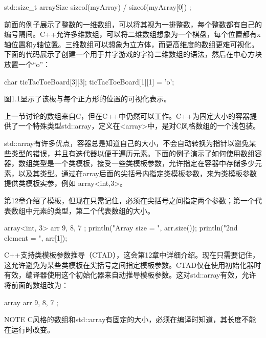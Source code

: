 \begin{cpp}
std::size_t arraySize { sizeof(myArray) / sizeof(myArray[0]) };
\end{cpp}

前面的例子展示了整数的一维数组，可以将其视为一排整数，每个整数都有自己的编号隔间。C++允许多维数组，可以将二维数组想象为一个棋盘，每个位置都有x轴位置和y轴位置。三维数组可以想象为立方体，而更高维度的数组更难可视化。下面的代码展示了创建一个用于井字游戏的字符二维数组的语法，然后在中心方块放置一个“o”：

\begin{cpp}
char ticTacToeBoard[3][3];
ticTacToeBoard[1][1] = 'o';
\end{cpp}

图1.1显示了该板与每个正方形的位置的可视化表示。



上一节讨论的数组来自C，但在C++中仍然可以工作。C++为固定大小的容器提供了一个特殊类型std::array，定义在<array>中，是对C风格数组的一个浅包装。

std::array有许多优点，容器总是知道自己的大小，不会自动转换为指针以避免某些类型的错误，并且有迭代器以便于遍历元素。下面的例子演示了如何使用数组容器，数组类型是一个类模板，接受一些类模板参数，允许指定在容器中存储多少元素，以及其类型。通过在array后面的尖括号内指定类模板参数，来为类模板参数提供类模板实参，例如 array<int,3>。

第12章介绍了模板，但现在只需记住，必须在尖括号之间指定两个参数；第一个代表数组中元素的类型，第二个代表数组的大小。

\begin{cpp}
array<int, 3> arr { 9, 8, 7 };
println("Array size = {}", arr.size());
println("2nd element = {}", arr[1]);
\end{cpp}

C++支持类模板参数推导（CTAD），这会第12章中详细介绍。现在只需要记住，这允许避免为某些类模板在尖括号之间指定模板参数。CTAD仅在使用初始化器时有效，编译器使用这个初始化器来自动推导模板参数。这对std::array有效，允许将前面的数组改为：

\begin{cpp}
array arr { 9, 8, 7 };
\end{cpp}

\begin{myNotic}{NOTE}
C风格的数组和std::array有固定的大小，必须在编译时知道，其长度不能在运行时改变。
\end{myNotic}

